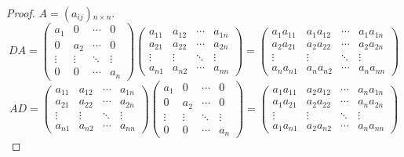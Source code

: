 \documentclass[class=linearalgebra,crop=false]{standalone}
\begin{document}
\begin{proof}
    $A = (a_{ij}){}_{n\times n}$.
    \[
        DA =
        \begin{pmatrix}
            a_{1}  & 0      & \cdots & 0      \\
            0      & a_{2}  & \cdots & 0      \\
            \vdots & \vdots & \ddots & \vdots \\
            0      & 0      & \cdots & a_{n}
        \end{pmatrix}
        \begin{pmatrix}
            a_{11} & a_{12} & \cdots & a_{1n} \\
            a_{21} & a_{22} & \cdots & a_{2n} \\
            \vdots & \vdots & \ddots & \vdots \\
            a_{n1} & a_{n2} & \cdots & a_{nn}
        \end{pmatrix}
        =
        \begin{pmatrix}
            a_{1}a_{11} & a_{1}a_{12} & \cdots & a_{1}a_{1n} \\
            a_{2}a_{21} & a_{2}a_{22} & \cdots & a_{2}a_{2n} \\
            \vdots      & \vdots      & \ddots & \vdots      \\
            a_{n}a_{n1} & a_{n}a_{n2} & \cdots & a_{n}a_{nn}
        \end{pmatrix}
    \]
    \[
        AD =
        \begin{pmatrix}
            a_{11} & a_{12} & \cdots & a_{1n} \\
            a_{21} & a_{22} & \cdots & a_{2n} \\
            \vdots & \vdots & \ddots & \vdots \\
            a_{n1} & a_{n2} & \cdots & a_{nn}
        \end{pmatrix}
        \begin{pmatrix}
            a_{1}  & 0      & \cdots & 0      \\
            0      & a_{2}  & \cdots & 0      \\
            \vdots & \vdots & \ddots & \vdots \\
            0      & 0      & \cdots & a_{n}
        \end{pmatrix}
        =
        \begin{pmatrix}
            a_{1}a_{11} & a_{2}a_{12} & \cdots & a_{n}a_{1n} \\
            a_{1}a_{21} & a_{2}a_{22} & \cdots & a_{n}a_{2n} \\
            \vdots      & \vdots      & \ddots & \vdots      \\
            a_{1}a_{n1} & a_{2}a_{n2} & \cdots & a_{n}a_{nn}
        \end{pmatrix}
    \]
\end{proof}
\end{document}

